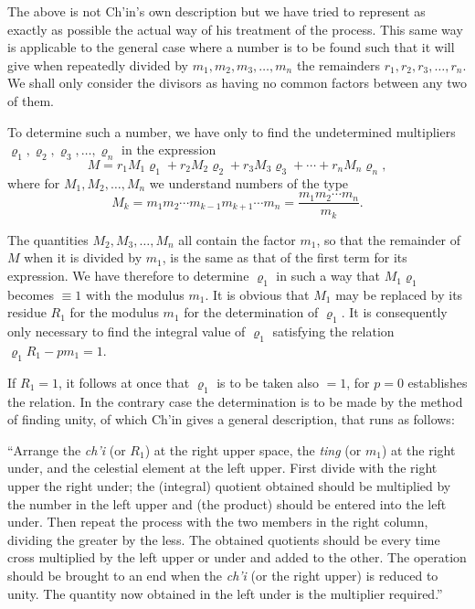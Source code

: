 \documentclass[11pt]{article}
\newcommand{\scanpage}[2]{\clearpage\setcounter{footnote}{0}\noindent{\footnotesize\color{gray}PDF page #1 · #2}\par\medskip}
\newcommand{\scanfooter}{}
\begin{document}
The above is not Ch'in's own description but we have tried to represent as exactly as possible the actual way of his treatment of the process. This same way is applicable to the general case where a number is to be found such that it will give when repeatedly divided by $m_1,m_2,m_3,\ldots,m_n$ the remainders $r_1,r_2,r_3,\ldots,r_n$. We shall only consider the divisors as having no common factors between any two of them.
\scanfooter

\scanpage{0082}{Chapter 11, printed page 68}
To determine such a number, we have only to find the undetermined multipliers $\varrho_1,\varrho_2,\varrho_3,\ldots,\varrho_n$ in the expression
\[
M=r_1M_1\varrho_1+r_2M_2\varrho_2+r_3M_3\varrho_3+\cdots+r_nM_n\varrho_n,
\]
where for $M_1,M_2,\ldots,M_n$ we understand numbers of the type
\[
M_k=m_1m_2\cdots m_{k-1}m_{k+1}\cdots m_n
=\frac{m_1m_2\cdots m_n}{m_k}.
\]

The quantities $M_2,M_3,\ldots,M_n$ all contain the factor $m_1$, so that the remainder of $M$ when it is divided by $m_1$, is the same as that of the first term for its expression. We have therefore to determine $\varrho_1$ in such a way that $M_1\varrho_1$ becomes $\equiv1$ with the modulus $m_1$. It is obvious that $M_1$ may be replaced by its residue $R_1$ for the modulus $m_1$ for the determination of $\varrho_1$. It is consequently only necessary to find the integral value of $\varrho_1$ satisfying the relation $\varrho_1R_1-pm_1=1$.

If $R_1=1$, it follows at once that $\varrho_1$ is to be taken also $=1$, for $p=0$ establishes the relation. In the contrary case the determination is to be made by the method of finding unity, of which Ch'in gives a general description, that runs as follows:

``Arrange the \emph{ch'i} (or $R_1$) at the right upper space, the \emph{ting} (or $m_1$) at the right under, and the celestial element at the left upper. First divide with the right upper the right under; the (integral) quotient obtained should be multiplied by the number in the left upper and (the product) should be entered into the left under. Then repeat the process with the two members in the right column, dividing the greater by the less. The obtained quotients should be every time cross multiplied by the left upper or under and added to the other. The operation should be brought to an end when the \emph{ch'i} (or the right upper) is reduced to unity. The quantity now obtained in the left under is the multiplier required.''
\end{document}
